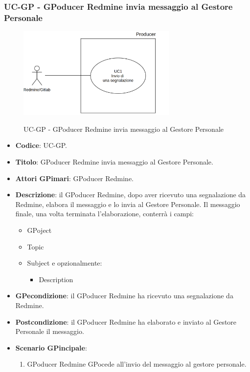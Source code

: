 \subsubsection{UC\theuccount-GP - GPoducer Redmine invia messaggio al Gestore Personale}
    \begin{figure}[H]
		\centering
		\includegraphics[width=0.7\textwidth]{img/UC1.png}\\
		\caption{UC\theuccount-GP - GPoducer Redmine invia messaggio al Gestore Personale}
	\end{figure}
	\begin{itemize}
		\item \textbf{Codice}: UC\theuccount-GP.
		\item \textbf{Titolo}: GPoducer Redmine invia messaggio al Gestore Personale.
		\item \textbf{Attori GPimari}: GPoducer Redmine.
		\item \textbf{Descrizione}: il GPoducer Redmine, dopo aver ricevuto una
		 segnalazione da Redmine, elabora il messaggio e lo invia al Gestore Personale.
		 Il messaggio finale, una volta terminata l'elaborazione, conterrà i campi:
		 \begin{itemize}
		 	\item GPoject
		 	\item Topic
		 	\item Subject e opzionalmente:
		 	\begin{itemize}
		 		\item Description
		 	\end{itemize}
		 \end{itemize}
		\item \textbf{GPecondizione}: il GPoducer Redmine ha ricevuto una segnalazione da Redmine.
		\item \textbf{Postcondizione}: il GPoducer Redmine ha elaborato e inviato al Gestore Personale il messaggio.
		\item \textbf{Scenario GPincipale}: 
		\begin{enumerate}
			\item GPoducer Redmine GPocede all'invio del messaggio al gestore personale.
		\end{enumerate}
		
	\end{itemize}
	
